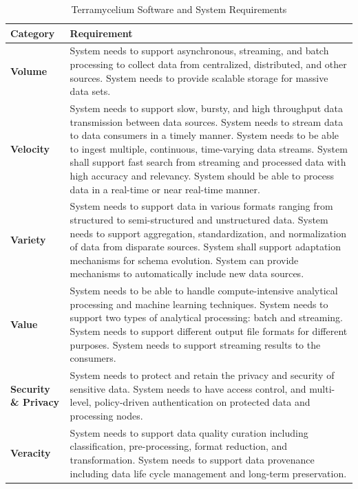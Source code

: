 \documentclass[journal]{IEEEtran}
\begin{document}
\begin{table}[!htbp]
  \renewcommand{\arraystretch}{1.3}
  \caption{Terramycelium Software and System Requirements}
  \label{table:systemRequirements}
  \centering
  \begin{tabular}{|l|p{12cm}|}
  \hline
  \textbf{Category} & \textbf{Requirement} \\
  \hline
  \textbf{Volume} & System needs to support asynchronous, streaming, and batch processing to collect data from centralized, distributed, and other sources. System needs to provide scalable storage for massive data sets. \\
  \hline
  \textbf{Velocity} & System needs to support slow, bursty, and high throughput data transmission between data sources. System needs to stream data to data consumers in a timely manner. System needs to be able to ingest multiple, continuous, time-varying data streams. System shall support fast search from streaming and processed data with high accuracy and relevancy. System should be able to process data in a real-time or near real-time manner. \\
  \hline
  \textbf{Variety} & System needs to support data in various formats ranging from structured to semi-structured and unstructured data. System needs to support aggregation, standardization, and normalization of data from disparate sources. System shall support adaptation mechanisms for schema evolution. System can provide mechanisms to automatically include new data sources. \\
  \hline
  \textbf{Value} & System needs to be able to handle compute-intensive analytical processing and machine learning techniques. System needs to support two types of analytical processing: batch and streaming. System needs to support different output file formats for different purposes. System needs to support streaming results to the consumers. \\
  \hline
  \textbf{Security \& Privacy} & System needs to protect and retain the privacy and security of sensitive data. System needs to have access control, and multi-level, policy-driven authentication on protected data and processing nodes. \\
  \hline
  \textbf{Veracity} & System needs to support data quality curation including classification, pre-processing, format reduction, and transformation. System needs to support data provenance including data life cycle management and long-term preservation. \\
  \hline
  \end{tabular}
  \end{table}
\end{document}
